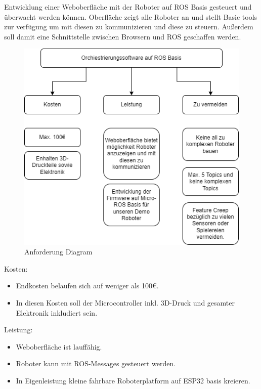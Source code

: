 \begin{flushleft}
    Entwicklung einer Weboberfläche mit der Roboter auf ROS Basis gesteuert und überwacht werden können.
    Oberfläche zeigt alle Roboter an und stellt Basic tools zur verfügung um mit diesen zu kommunizieren
    und diese zu steuern.
    Außerdem soll damit eine Schnittstelle zwischen Browsern und ROS geschaffen werden.

    \begin{figure}[h!]
        \centering
        \includegraphics[width=1\textwidth]{imgs/Zielsetzung.png}
        \caption{Anforderung Diagram}
        \label{fig:dia_anforderung}%
    \end{figure}

    Kosten:
    \begin{itemize}
    \item Endkosten belaufen sich auf weniger als 100€.
    \item In diesen Kosten soll der Microcontroller inkl. 3D-Druck und gesamter Elektronik inkludiert sein.
    \end{itemize}

    Leistung:
    \begin{itemize}
    \item Weboberfläche ist lauffähig.
    \item Roboter kann mit ROS-Messages gesteuert werden.
    \item In Eigenleistung kleine fahrbare Roboterplatform auf ESP32 basis kreieren.
    \end{itemize}
        

\end{flushleft}
